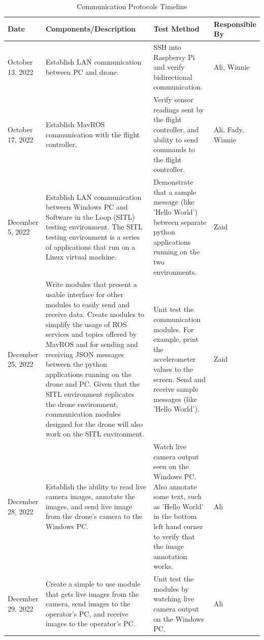\documentclass[12pt, titlepage]{article}
\begin{document}
\begin{table}[!h]
\begin{center}
\caption {Communication Protocols Timeline}
\label{tab:commTimeline}
\begin{tabular}{ | m{1.7cm} | m{6.7cm} | m{4.6cm} | m{2cm} | } 
\hline
Date & Components/Description & Test Method & Responsible By \\
\hline
October 13, 2022 & Establish LAN communication between PC and drone. & 
    SSH into Raspberry Pi and verify bidirectional communication. & Ali, Winnie \\
\hline
October 17, 2022 & Establish MavROS communication with the flight controller. & 
    Verify sensor readings sent by the flight controller, and ability to send commands to the flight controller. & Ali, Fady, Winnie \\
\hline
December 5, 2022 & Establish LAN communication between Windows PC and Software in the Loop (SITL) testing environment. The SITL testing environment is a series of applications that run on a Linux virtual machine. & 
    Demonstrate that a sample message (like 'Hello World') between separate python applications running on the two environments. & Zaid \\
\hline
December 25, 2022 & Write modules that present a usable interface for other modules to easily send and receive data. 
    Create modules to simplify the usage of ROS services and topics offered by MavROS and for sending and receiving JSON messages between the python applications running on the drone and PC. Given that the SITL environment replicates the drone environment, communication modules designed for the drone will also work on the SITL environment. & 
    Unit test the communication modules. For example, print the accelerometer values to the screen. Send and receive sample messages (like 'Hello World'). & Zaid \\
\hline
December 28, 2022 & Establish the ability to read live camera images, annotate the images, and send live image from the drone's camera to the Windows PC. & 
    Watch live camera output seen on the Windows PC. Also annotate some text, such as 'Hello World' in the bottom left hand corner to verify that the image annotation works. & Ali \\
\hline
December 29, 2022 & Create a simple to use module that gets live images from the camera, send images to the operator's PC, and receive images to the operator's PC. & 
    Unit test the modules by watching live camera output on the Windows PC. & Ali \\
\hline
\end{tabular}
\end{center}
\end{table}
\end{document}
